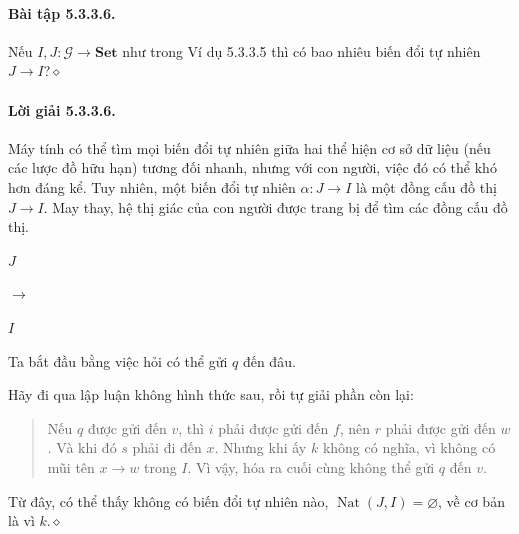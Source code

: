 \paragraph{Bài tập 5.3.3.6.} Nếu $I,J:\mathcal G\to\mathbf{Set}$ như trong Ví dụ 5.3.3.5 thì có bao nhiêu biến đổi tự nhiên $J\to I$?\hfill$\diamond$
\paragraph{Lời giải 5.3.3.6.} Máy tính có thể tìm mọi biến đổi tự nhiên giữa hai thể hiện cơ sở dữ liệu (nếu các lược đồ hữu hạn) tương đối nhanh, nhưng với con người, việc đó có thể khó hơn đáng kể. Tuy nhiên, một biến đổi tự nhiên $\alpha:J\to I$ là một đồng cấu đồ thị
$J\to I$. May thay, hệ thị giác của con người được trang bị để tìm các đồng cấu đồ thị.
\begin{center}\begin{minipage}{.50\linewidth}\centering$J$\par\ctfiveGraphJ\end{minipage}\quad$\longrightarrow$\quad\begin{minipage}{.34\linewidth}\centering$I$\par\ctfiveGraphI\end{minipage}\end{center}
Ta bắt đầu bằng việc hỏi có thể gửi $q$ đến đâu.

Hãy đi qua lập luận không hình thức sau, rồi tự giải phần còn lại:
\begin{quote}Nếu $q$ được gửi đến $v$, thì $i$ phải được gửi đến $f$, nên $r$ phải được gửi đến $w$. Và khi đó $s$ phải đi đến $x$. Nhưng khi ấy $k$ không có nghĩa, vì không có mũi tên $x\to w$ trong $I$. Vì vậy, hóa ra cuối cùng không thể gửi $q$ đến $v$.\end{quote}
Từ đây, có thể thấy không có biến đổi tự nhiên nào, $\operatorname{Nat}(J,I)=\varnothing$, về cơ bản là vì $k$.\hfill$\diamond$
